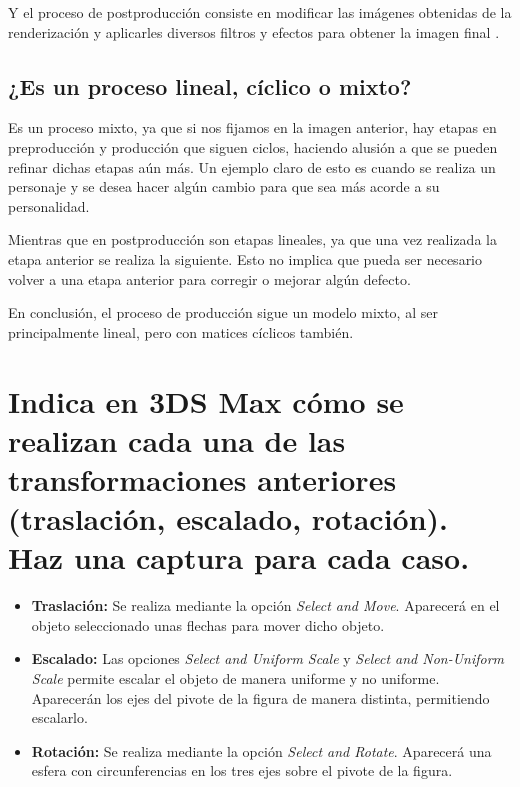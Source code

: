 \documentclass{article}
\begin{document}
Y el proceso de postproducción consiste en modificar las imágenes obtenidas de la renderización y aplicarles diversos filtros y efectos para obtener la imagen final \cite{uclm}.

\subsection{¿Es un proceso lineal, cíclico o mixto?}
Es un proceso mixto, ya que si nos fijamos en la imagen anterior, hay etapas en preproducción y producción que siguen ciclos, haciendo alusión a que se pueden refinar dichas etapas aún más. Un ejemplo claro de esto es cuando se realiza un personaje y se desea hacer algún cambio para que sea más acorde a su personalidad.

Mientras que en postproducción son etapas lineales, ya que una vez realizada la etapa anterior se realiza la siguiente. Esto no implica que pueda ser necesario volver a una etapa anterior para corregir o mejorar algún defecto.

En conclusión, el proceso de producción sigue un modelo mixto, al ser principalmente lineal, pero con matices cíclicos también.

\section{Indica en 3DS Max cómo se realizan cada una de las transformaciones anteriores (traslación, escalado, rotación). Haz una captura para cada caso.}

\begin{itemize}
    \item \textbf{Traslación: }Se realiza mediante la opción \textit{Select and Move}. Aparecerá en el objeto seleccionado unas flechas para mover dicho objeto.
    
    
    \item \textbf{Escalado: }Las opciones \textit{Select and Uniform Scale} y \textit{Select and Non-Uniform Scale} permite escalar el objeto de manera uniforme y no uniforme. Aparecerán los ejes del pivote de la figura de manera distinta, permitiendo escalarlo.
    

    \item \textbf{Rotación: }Se realiza mediante la opción \textit{Select and Rotate}. Aparecerá una esfera con circunferencias en los tres ejes sobre el pivote de la figura.
    
\end{itemize}
\end{document}
